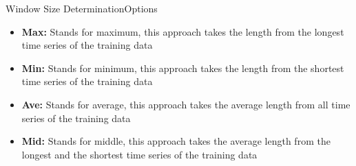 \begin{frame}{Window Size Determination}{Options}
    \begin{itemize}
        \item \textbf{Max:} Stands for maximum, this approach takes the length from the longest time series of the training
            data
        \pause
        \item \textbf{Min:} Stands for minimum, this approach takes the length from the shortest time series of the training
            data
        \pause
        \item \textbf{Ave:} Stands for average, this approach takes the average length from all time series of the training
            data
        \pause
        \item \textbf{Mid:} Stands for middle, this approach takes the average length from the longest and the shortest time
            series of the training data
    \end{itemize}
\end{frame}
